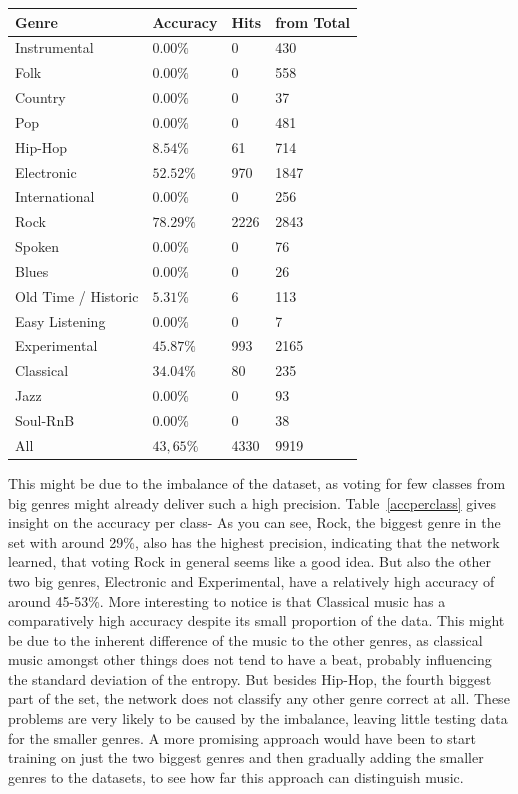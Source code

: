 \begin{center}
	\begin{tabular}{ p{} p{} p{} p{}}
		Genre & Accuracy & Hits & from Total\\
		\hline
		Instrumental & $0.00\%$ & 0 & 430\\
		Folk & $0.00\%$ & 0 & 558\\
		Country & $0.00\%$ & 0 & 37\\
		Pop & $0.00\%$ & 0 & 481\\
		Hip-Hop & $8.54\%$ & 61 & 714\\
		Electronic & $52.52\%$ & 970 & 1847\\
		International & $0.00\%$ & 0 & 256\\
		Rock & $78.29\%$ & 2226 & 2843\\
		Spoken & $0.00\%$ & 0 & 76\\
		Blues & $0.00\%$ & 0 & 26\\
		Old Time / Historic & $5.31\%$ & 6 & 113\\
		Easy Listening & $0.00\%$ & 0 & 7\\
		Experimental & $45.87\%$ & 993 & 2165\\
		Classical & $34.04\%$ & 80 & 235\\
		Jazz & $0.00\%$ & 0 & 93\\
		Soul-RnB & $0.00\%$ & 0 & 38\\
		\hline
		All & $43,65\%$ & 4330 & 9919\\
	\end{tabular}
	\label{accperclass}
\end{center}

This might be due to the imbalance of the dataset, as voting for few
classes from big genres might already deliver such a high precision.
Table~\ref{accperclass} gives insight on the accuracy per class- As you
can see, Rock, the biggest genre in the set with around 29\%, also has
the highest precision, indicating that the network learned, that voting
Rock in general seems like a good idea. But also the other two big
genres, Electronic and Experimental, have a relatively high accuracy of
around 45-53\%. More interesting to notice is that Classical music has a
comparatively high accuracy despite its small proportion of the data.
This might be due to the inherent difference of the music to the other
genres, as classical music amongst other things does not tend to have a
beat, probably influencing the standard deviation of the entropy. But
besides Hip-Hop, the fourth biggest part of the set, the network does
not classify any other genre correct at all. These problems are very
likely to be caused by the imbalance, leaving little testing data for
the smaller genres. A more promising approach would have been to start
training on just the two biggest genres and then gradually adding the
smaller genres to the datasets, to see how far this approach can
distinguish music.

